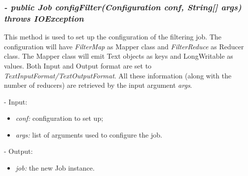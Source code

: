 \documentclass[]{report}
\begin{document}
	\subsubsection*{\textit{\textbf{-} public Job configFilter(Configuration conf, String[] args) throws IOException }}   	
	This method is used to set up the configuration of the filtering job. The configuration will have \textit{FilterMap} as Mapper class and \textit{FilterReduce} as Reducer class. The Mapper class will emit Text objects as keys and LongWritable as values. Both Input and Output format are set to \textit{TextInputFormat/TextOutputFormat}. All these information (along with the number of reducers) are retrieved by the input argument \textit{args}.
	\begin{description}
		\item - Input:
		\begin{itemize}
			\item \textit{conf:} configuration to set up;
			\item \textit{args:} list of arguments used to configure the job.
		\end{itemize}
	\end{description}
	\begin{description}
		\item - Output:
		\begin{itemize}
			\item \textit{job:} the new Job instance. 
		\end{itemize}
	\end{description}
	
\end{document}
